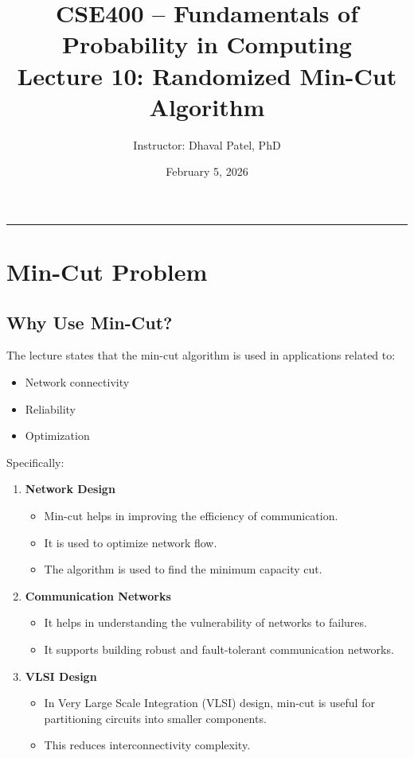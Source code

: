 \documentclass[12pt]{article}
\title{CSE400 -- Fundamentals of Probability in Computing\\
Lecture 10: Randomized Min-Cut Algorithm}
\author{Instructor: Dhaval Patel, PhD}
\date{February 5, 2026}
\begin{document}
\maketitle

\hrule
\vspace{0.5cm}

\section{Min-Cut Problem}

\subsection{Why Use Min-Cut?}

The lecture states that the min-cut algorithm is used in applications related to:

\begin{itemize}
    \item Network connectivity
    \item Reliability
    \item Optimization
\end{itemize}

Specifically:

\begin{enumerate}
    \item \textbf{Network Design}
    \begin{itemize}
        \item Min-cut helps in improving the efficiency of communication.
        \item It is used to optimize network flow.
        \item The algorithm is used to find the minimum capacity cut.
    \end{itemize}

    \item \textbf{Communication Networks}
    \begin{itemize}
        \item It helps in understanding the vulnerability of networks to failures.
        \item It supports building robust and fault-tolerant communication networks.
    \end{itemize}

    \item \textbf{VLSI Design}
    \begin{itemize}
        \item In Very Large Scale Integration (VLSI) design, min-cut is useful for partitioning circuits into smaller components.
        \item This reduces interconnectivity complexity.
    \end{itemize}
\end{enumerate}
\end{document}
